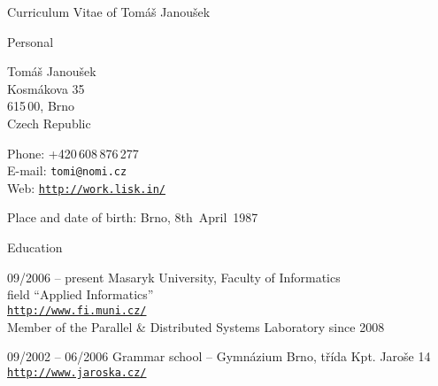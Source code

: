 \documentclass[12pt,a4paper,english,pdftex]{article}
\begin{document}
\begin{cv}{Curriculum Vitae of Tomáš Janoušek}
    \begin{cvlist}{Personal}
        \item
            Tomáš Janoušek \\
            Kosmákova 35 \\
            615\,00, Brno \\
            Czech Republic
        \item
            Phone: +420\,608\,876\,277 \\
            E-mail: \texttt{tomi@nomi.cz} \\
            Web: \href{http://work.lisk.in/}{\texttt{http://work.lisk.in/}}
        \item
            Place and date of birth: Brno, 8th~April~1987
    \end{cvlist}

    \goodbreak
    \begin{cvlist}{Education}
        \item[09/2006 -- present]
            Masaryk University, Faculty of Informatics \\
            field ``Applied Informatics'' \\
            \href{http://www.fi.muni.cz/}{\texttt{http://www.fi.muni.cz/}}
	    \\[2mm]
	    Member of the Parallel \& Distributed Systems Laboratory since
	    2008
        \item[09/2002 -- 06/2006]
            Grammar school -- Gymnázium Brno, třída Kpt. Jaroše 14 \\
            \href{http://www.jaroska.cz/}{\texttt{http://www.jaroska.cz/}}
    \end{cvlist}


\end{cv}
\end{document}
